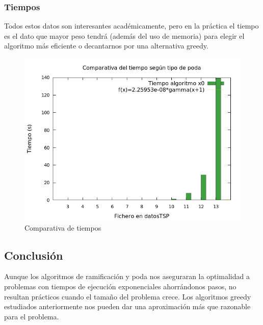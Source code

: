 \subsubsection{Tiempos}
Todos estos datos son interesantes académicamente, pero en la práctica el tiempo es el dato
que mayor peso tendrá (además del uso de memoria) para elegir el algoritmo más eficiente o 
decantarnos por una alternativa greedy.

\begin{figure}[H]
    \centering
    \includegraphics[scale=0.65]{../TSP/Graficas/graficaTiempos.png}
    \caption{Comparativa de tiempos}
\end{figure}



\subsection{Conclusión}
Aunque los algoritmos de ramificación y poda nos aseguraran la optimalidad a problemas con
tiempos de ejecución exponenciales ahorrándonos pasos, no resultan prácticos cuando el tamaño
del problema crece. Los algoritmos greedy estudiados anteriormente nos pueden dar una aproximación
más que razonable para el problema.